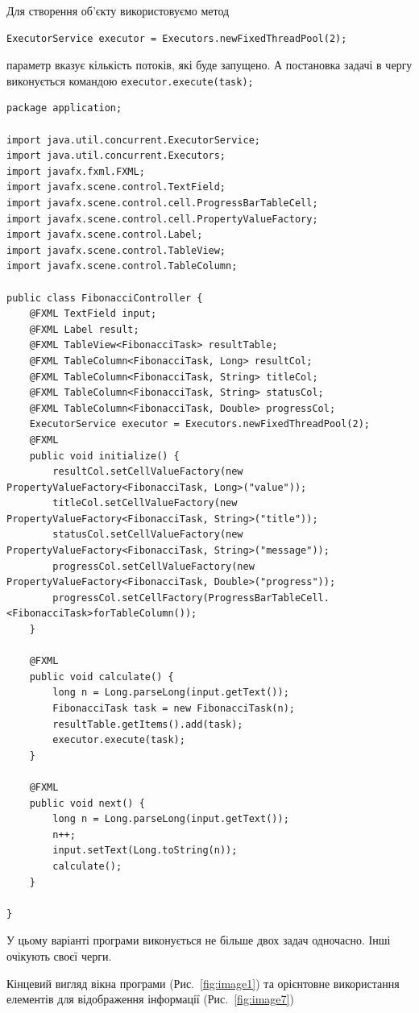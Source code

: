 \begin{enumerate}
	Для створення об'єкту використовуємо метод
\begin{verbatim}
ExecutorService executor = Executors.newFixedThreadPool(2);
\end{verbatim}
	параметр вказує кількість потоків, які буде запущено. А постановка задачі в чергу виконується командою \texttt{executor.execute(task);}

\begin{verbatim}
package application;

import java.util.concurrent.ExecutorService;
import java.util.concurrent.Executors;
import javafx.fxml.FXML;
import javafx.scene.control.TextField;
import javafx.scene.control.cell.ProgressBarTableCell;
import javafx.scene.control.cell.PropertyValueFactory;
import javafx.scene.control.Label;
import javafx.scene.control.TableView;
import javafx.scene.control.TableColumn;

public class FibonacciController {
	@FXML TextField input;
	@FXML Label result;
	@FXML TableView<FibonacciTask> resultTable;
	@FXML TableColumn<FibonacciTask, Long> resultCol;
	@FXML TableColumn<FibonacciTask, String> titleCol;
	@FXML TableColumn<FibonacciTask, String> statusCol;
	@FXML TableColumn<FibonacciTask, Double> progressCol;
	ExecutorService executor = Executors.newFixedThreadPool(2);
	@FXML
	public void initialize() {
		resultCol.setCellValueFactory(new PropertyValueFactory<FibonacciTask, Long>("value"));
		titleCol.setCellValueFactory(new PropertyValueFactory<FibonacciTask, String>("title"));
		statusCol.setCellValueFactory(new PropertyValueFactory<FibonacciTask, String>("message"));
		progressCol.setCellValueFactory(new PropertyValueFactory<FibonacciTask, Double>("progress"));
		progressCol.setCellFactory(ProgressBarTableCell.<FibonacciTask>forTableColumn());
	}

	@FXML
	public void calculate() {
		long n = Long.parseLong(input.getText());
		FibonacciTask task = new FibonacciTask(n);
		resultTable.getItems().add(task);
		executor.execute(task);
	}

	@FXML
	public void next() {
		long n = Long.parseLong(input.getText());
		n++;
		input.setText(Long.toString(n));
		calculate();
	}

}
\end{verbatim}

	У цьому варіанті програми виконується не більше двох задач одночасно. Інші очікують своєї черги.

	Кінцевий вигляд вікна програми (Рис.~\ref{fig:image1}) та орієнтовне використання елементів для відображення інформації (Рис.~\ref{fig:image7})
	

\end{enumerate}
